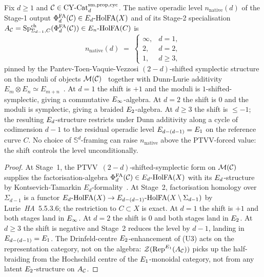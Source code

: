 \begin{proposition}
\ClaimStatusTheorem\label{wn:prop:agent5-ptvv-shift}
Fix $d \ge 1$ and $\mathcal{C} \in \mathrm{CY}\text{-}\mathrm{Cat}_d^{\mathrm{sm,prop,cyc}}$. The native
operadic level $n_{\mathrm{native}}(d)$ of the Stage-1 output
$\Phi^{\mathrm{FA}}_d(\mathcal{C}) \in E_d\text{-}\mathrm{HolFA}(X)$ and of its Stage-2 specialisation
$A_{\mathcal{C}} = \mathrm{Sp}^{\mathrm{ch}}_{\Sigma_{d-1}, C}(\Phi^{\mathrm{FA}}_d(\mathcal{C})) \in E_n\text{-}\mathrm{HolFA}(C)$ is
\[
  n_{\mathrm{native}}(d) \;=\; \begin{cases} \infty, & d = 1, \\ 2, & d = 2, \\ 1, & d \ge 3, \end{cases}
\]
pinned by the Pantev-Toen-Vaquie-Vezzosi $(2-d)$-shifted symplectic
structure on the moduli of objects $\mathcal{M}(\mathcal{C})$~\cite{PTVV2013} together
with Dunn-Lurie additivity $E_m \otimes E_n \simeq E_{m+n}$~\cite{LurieHA}.
At $d = 1$ the shift is $+1$ and the moduli is $1$-shifted-symplectic,
giving a commutative $E_\infty$-algebra. At $d = 2$ the shift is $0$ and
the moduli is symplectic, giving a braided $E_2$-algebra. At $d \ge 3$
the shift is $\le -1$; the resulting $E_d$-structure restricts under
Dunn additivity along a cycle of codimension $d - 1$ to the
residual operadic level
$E_{d - (d-1)} = E_1$ on the reference curve $C$. No choice of
$\mathbb{S}^d$-framing can raise $n_{\mathrm{native}}$ above the
PTVV-forced value: the shift controls the level unconditionally.
\end{proposition}

\begin{proof}
At Stage~1, the PTVV~$(2-d)$-shifted-symplectic form on $\mathcal{M}(\mathcal{C})$
supplies the factorisation-algebra
$\Phi^{\mathrm{FA}}_d(\mathcal{C}) \in E_d\text{-}\mathrm{HolFA}(X)$ with its $E_d$-structure by
Kontsevich-Tamarkin $E_d$-formality~\cite{Kontsevich1999,Tamarkin2007}.
At Stage~2, factorisation homology over $\Sigma_{d-1}$ is a functor
$E_d\text{-}\mathrm{HolFA}(X) \to E_{d - (d-1)}\text{-}\mathrm{HolFA}(X \setminus \Sigma_{d-1})$
by Lurie~\textit{HA}~5.5.3.6; the restriction to $C \subset X$ is
exact. At $d = 1$ the shift is $+1$ and both stages land in $E_\infty$.
At $d = 2$ the shift is $0$ and both stages land in $E_2$. At
$d \ge 3$ the shift is negative and Stage~2 reduces the level by
$d - 1$, landing in $E_{d - (d-1)} = E_1$. The Drinfeld-centre
$E_2$-enhancement of (U3) acts on the representation category, not
on the algebra: $\mathcal{Z}(\mathrm{Rep}^{E_1}(A_{\mathcal{C}}))$ picks up the half-braiding
from the Hochschild centre of the $E_1$-monoidal category, not from
any latent $E_2$-structure on $A_{\mathcal{C}}$.
\end{proof}

